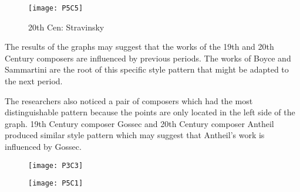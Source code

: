 \begin{figure}[!htb]
\caption{20th Cen: Stravinsky}
\centering
\texttt{[image: P5C5]}
\end{figure}

The results of the graphs may suggest that the works of the 19th and 20th Century composers are influenced by previous periods. The works of Boyce and Sammartini are the root of this specific style pattern that might be adapted to the next period. 

The researchers also noticed a pair of composers which had the most distinguishable pattern because the points are only located in the left side of the graph. 19th Century composer Gossec and 20th Century composer Antheil produced similar style pattern which may suggest that Antheil’s work is influenced by Gossec.

\begin{figure}[!htb]
\begin{minipage}{.5\textwidth}
  \centering
  \texttt{[image: P3C3]}
  \label{fig:test1}
\end{minipage}
\begin{minipage}{.5\textwidth}
  \centering
  \texttt{[image: P5C1]}
  \label{fig:test1}
\end{minipage}
\end{figure}